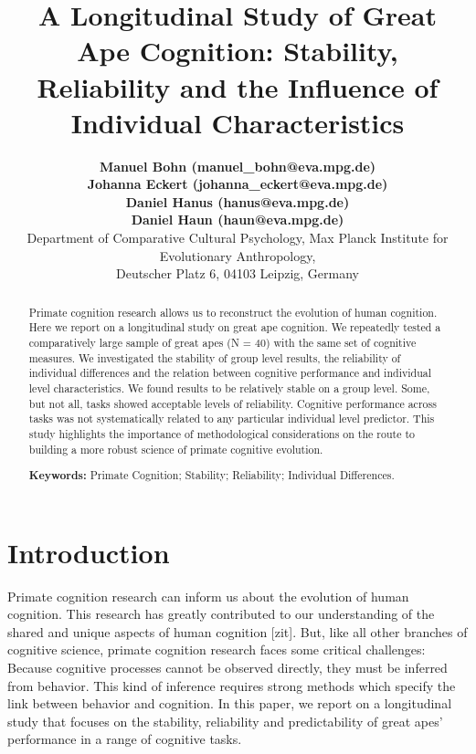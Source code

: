 \documentclass[10pt, letterpaper]{article}
\title{A Longitudinal Study of Great Ape Cognition: Stability, Reliability and
the Influence of Individual Characteristics}
\author{{\large \bf Manuel Bohn (manuel\_bohn@eva.mpg.de)} \\ {\large \bf Johanna Eckert (johanna\_eckert@eva.mpg.de)} \\ {\large \bf Daniel Hanus (hanus@eva.mpg.de)} \\ {\large \bf Daniel Haun (haun@eva.mpg.de)} \\ Department of Comparative Cultural Psychology, Max Planck Institute for Evolutionary Anthropology, \\ Deutscher Platz 6, 04103 Leipzig, Germany}
\begin{document}
\maketitle

\begin{abstract}
Primate cognition research allows us to reconstruct the evolution of
human cognition. Here we report on a longitudinal study on great ape
cognition. We repeatedly tested a comparatively large sample of great
apes (N = 40) with the same set of cognitive measures. We investigated
the stability of group level results, the reliability of individual
differences and the relation between cognitive performance and
individual level characteristics. We found results to be relatively
stable on a group level. Some, but not all, tasks showed acceptable
levels of reliability. Cognitive performance across tasks was not
systematically related to any particular individual level predictor.
This study highlights the importance of methodological considerations on
the route to building a more robust science of primate cognitive
evolution.

\textbf{Keywords:}
Primate Cognition; Stability; Reliability; Individual Differences.
\end{abstract}

\hypertarget{introduction}{%
\section{Introduction}\label{introduction}}

Primate cognition research can inform us about the evolution of human
cognition. This research has greatly contributed to our understanding of
the shared and unique aspects of human cognition {[}zit{]}. But, like
all other branches of cognitive science, primate cognition research
faces some critical challenges: Because cognitive processes cannot be
observed directly, they must be inferred from behavior. This kind of
inference requires strong methods which specify the link between
behavior and cognition. In this paper, we report on a longitudinal study
that focuses on the stability, reliability and predictability of great
apes' performance in a range of cognitive tasks.
\end{document}
